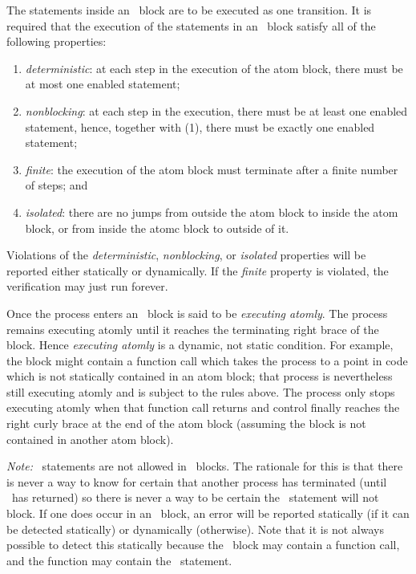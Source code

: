 The statements inside an \catom\ block are to be executed as one
transition. It is required that the execution of the statements in an
\catom\ block satisfy all of the following properties:
\begin{enumerate}
\item \emph{deterministic}: at each step in the execution of the atom
  block, there must be at most one enabled statement;
\item \emph{nonblocking}: at each step in the execution, there must be
  at least one enabled statement, hence, together with (1), there must
  be exactly one enabled statement;
\item \emph{finite}: the execution of the atom block must terminate
  after a finite number of steps; and
\item \emph{isolated}: there are no jumps from outside the atom block
  to inside the atom block, or from inside the atomc block to outside
  of it.
\end{enumerate}

Violations of the \emph{deterministic}, \emph{nonblocking}, or
\emph{isolated} properties will be reported either statically or
dynamically.  If the \emph{finite} property is violated, the
verification may just run forever.

Once the process enters an \catom\ block is said to be \emph{executing
  atomly}.  The process remains executing atomly until it reaches the
terminating right brace of the block.  Hence \emph{executing atomly}
is a dynamic, not static condition.  For example, the block might
contain a function call which takes the process to a point in code
which is not statically contained in an atom block; that process is
nevertheless still executing atomly and is subject to the rules above.
The process only stops executing atomly when that function call
returns and control finally reaches the right curly brace at the end
of the atom block (assuming the block is not contained in another atom
block).

\emph{Note:} \cwait\ statements are not allowed in \catom\ blocks.
The rationale for this is that there is never a way to know for
certain that another process has terminated (until \cwait\ has
returned) so there is never a way to be certain the \cwait\ statement
will not block.  If one does occur in an \catom\ block, an error will
be reported statically (if it can be detected statically) or
dynamically (otherwise).  Note that it is not always possible to
detect this statically because the \catom\ block may contain a
function call, and the function may contain the \cwait\ statement.

